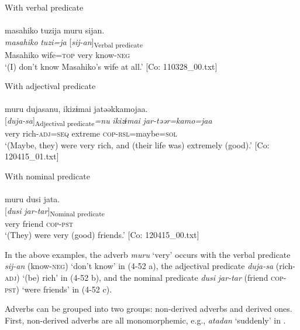 \ea  \ea With verbal predicate \label{ex:4.52}\\\\
\glll    masahiko  tuzija  muru  sijan.\\
    \textit{masahiko}  \textit{tuzi=ja}  \textit{}  [\textit{sij-an}]\textsubscript{Verbal predicate}\\
    Masahiko  wife=\textsc{top}  very  know-\textsc{neg}\\
    \glt     ‘(I) don’t know Masahiko’s wife at all.’ [Co: 110328\_00.txt]

  \ex With adjectival predicate\\\\
\glll    muru  dujasanu,  ikizɨmai  jatəəkkamojaa.\\
    \textit{}  [\textit{duja-sa}]\textsubscript{Adjectival predicate}\textit{=nu}  \textit{ikizɨmai}  \textit{jar-təər=kamo=jaa}\\
    very  rich-\textsc{adj}=\textsc{seq}  extreme  \textsc{cop}-\textsc{rsl}=maybe=\textsc{sol}\\
    \glt     ‘(Maybe, they) were very rich, and (their life was) extremely (good).’ [Co: 120415\_01.txt]

\ex With nominal predicate\\\\
\glll  muru  dusi  jata.\\
    \textit{}  [\textit{dusi}  \textit{jar-tar}]\textsubscript{Nominal predicate}\\
    very  friend  \textsc{cop}-\textsc{pst}\\
    \glt     ‘(They) were very (good) friends.’ [Co: 120415\_00.txt]
    \z
\z

In the above examples, the adverb \textit{muru} ‘very’ occurs with the verbal predicate \textit{sij-an} (know-\textsc{neg}) ‘don’t know’ in (4-52 a), the adjectival predicate \textit{duja-sa} (rich-\textsc{adj}) ‘(be) rich’ in (4-52 b), and the nominal predicate \textit{dusi} \textit{jar-tar} (friend \textsc{cop}-\textsc{pst}) ‘were friends’ in (4-52 c).

  Adverbs can be grouped into two groups: non-derived adverbs and derived ones. First, non-derived adverbs are all monomorphemic, e.g., \textit{atadan} ‘suddenly’ in .

